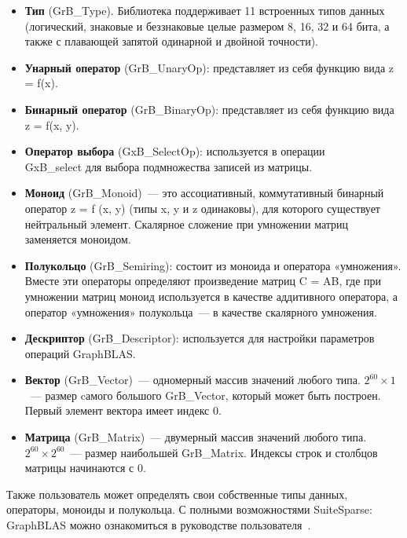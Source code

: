 \documentclass[14pt]{matmex-diploma-custom}
\begin{document}
\begin{itemize}
\item \textbf{Тип} (GrB\_Type). Библиотека поддерживает 11 встроенных типов данных (логический, знаковые и беззнаковые целые размером 8, 16, 32 и 64 бита, а также с плавающей запятой одинарной и двойной точности). 
\item \textbf{Унарный оператор} (GrB\_UnaryOp): представляет из себя функцию вида z = f(x).
\item \textbf{Бинарный оператор} (GrB\_BinaryOp): представляет из себя функцию вида z = f(x, y).
\item \textbf{Оператор выбора} (GxB\_SelectOp): используется в операции \\GxB\_select для выбора подмножества записей из матрицы.
\item \textbf{Моноид} (GrB\_Monoid)~--- это ассоциативный, коммутативный бинарный оператор z = f (x, y) (типы x, y и z одинаковы), для которого существует нейтральный элемент. Скалярное сложение при умножении матриц заменяется моноидом.
\item \textbf{Полукольцо} (GrB\_Semiring): состоит из моноида и оператора «умножения». Вместе эти операторы определяют произведение матриц C = AB, где при умножении матриц моноид используется в качестве аддитивного оператора, а оператор «умножения» полукольца~--- в качестве скалярного умножения.
\item \textbf{Дескриптор} (GrB\_Descriptor): используется для настройки параметров операций GraphBLAS.
\item \textbf{Вектор} (GrB\_Vector)~--- одномерный массив значений любого типа. $2^{60}\times 1$~--- размер cамого большого GrB\_Vector, который может быть построен. Первый элемент вектора имеет индекс 0.
\item \textbf{Матрица} (GrB\_Matrix)~--- двумерный массив значений любого типа. $2^{60}\times 2^{60}$~--- размер наибольшей GrB\_Matrix. Индексы строк и столбцов матрицы начинаются с 0.
\end{itemize}
Также пользователь может определять свои собственные типы данных, операторы, моноиды и полукольца. С полными возможностями SuiteSparse: GraphBLAS можно ознакомиться в руководстве пользователя~\cite{UserGuide}.
\end{document}
